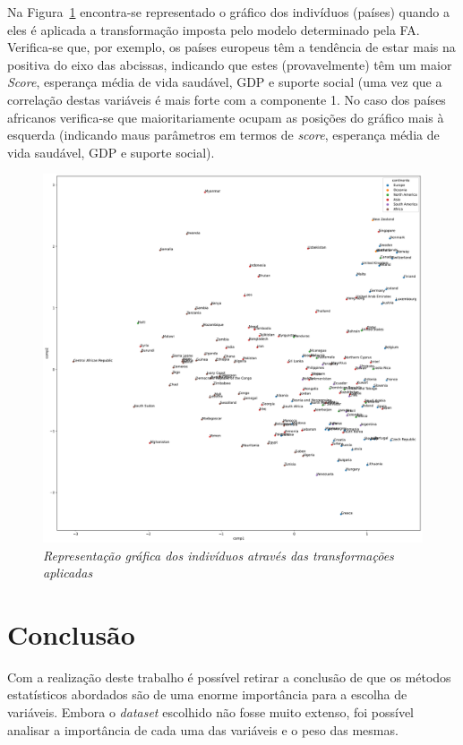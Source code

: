 \documentclass[12pt, a4paper]{article}
\begin{document}
Na Figura~\ref{fig:fig10} encontra-se representado o gráfico dos indivíduos
(países) quando a eles é aplicada a transformação imposta pelo modelo
determinado pela FA. Verifica-se que, por exemplo, os países europeus
têm a tendência de estar mais na positiva do eixo das abcissas,
indicando que estes (provavelmente) têm um maior \emph{Score}, esperança
média de vida saudável, GDP e suporte social (uma vez que a correlação
destas variáveis é mais forte com a componente 1. No caso dos países
africanos verifica-se que maioritariamente ocupam as posições do gráfico
mais à esquerda (indicando maus parâmetros em termos de \emph{score},
esperança média de vida saudável, GDP e suporte social).

\begin{figure}[h!]
\includegraphics[scale=0.40]{IndividualsMap.pdf}
\centering
\caption{\emph{Representação gráfica dos indivíduos através das transformações aplicadas}}
\label{fig:fig10}
\end{figure}


\section{Conclusão} %
\label{sec:conclusão}

Com a realização deste trabalho é possível retirar a conclusão de que os
métodos estatísticos abordados são de uma enorme importância para a
escolha de variáveis. Embora o \emph{dataset} escolhido não fosse muito
extenso, foi possível analisar a importância de cada uma das variáveis e
o peso das mesmas.
\end{document}
